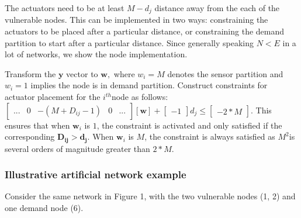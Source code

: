 \documentclass[authoryear,preprint,review,12pt]{elsarticle}
\begin{document}
The actuators need to be at least $M-d_{j}$ distance away from the
each of the vulnerable nodes. This can be implemented in two ways:
constraining the actuators to be placed after a particular distance,
or constraining the demand partition to start after a particular distance.
Since generally speaking $N<E$ in a lot of networks, we show the
node implementation.

Transform the $\mathbf{y}$ vector to $\mathbf{w},$ where $w_{i}=M$
denotes the sensor partition and $w_{i}=1$ implies the node is in
demand partition. Construct constraints for actuator placement for
the $i^{th}$node as follows: $\left[\begin{array}{ccccc}
... & 0 & -(M+D_{ij}-1) & 0 & ...\end{array}\right]\left[\mathbf{\mathbf{w}}\right]+\left[\begin{array}{c}
-1\end{array}\right]d_{j}\leq\left[\begin{array}{c}
-2*M\end{array}\right]$. This ensures that when $\mathbf{w}_{i}$ is $1$, the constraint
is activated and only satisfied if the corresponding $\mathbf{D_{ij}>d_{j}}$.
When $\mathbf{w}_{i}$ is $M$, the constraint is always satisfied
as $M^{2}$is several orders of magnitude greater than $2*M$.


\subsubsection{Illustrative artificial network example}

Consider the same network in Figure 1, with the two vulnerable nodes
(1, 2) and one demand node (6).
\end{document}
